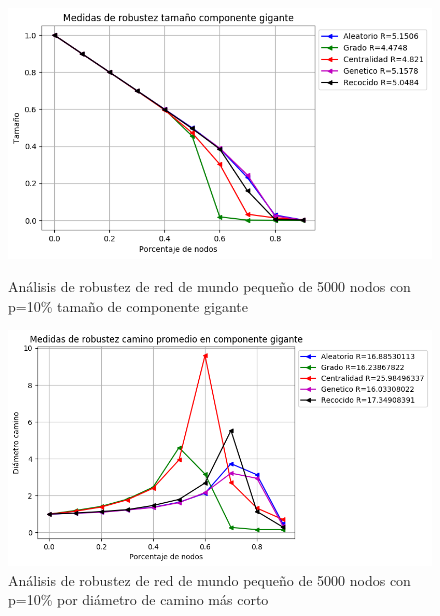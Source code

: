\begin{figure}[!htb]
    \begin{minipage}{0.48\textwidth}
        \centering
        \includegraphics[scale=0.4]{CapituloAAnexos/imagenesAnexoC/Robustez/grafica_GC20180510_143549SmallWorld5000NodesRewire01}
        \caption{Análisis de robustez de red de mundo pequeño de 5000 nodos con p=10\% tamaño de componente gigante}
    \end{minipage}\hfill
   \begin{minipage}{0.48\textwidth}
         \centering
       \includegraphics[scale=0.4]{CapituloAAnexos/imagenesAnexoC/Robustez/grafica_APL20180510_143549SmallWorld5000NodesRewire01}
        \caption{Análisis de robustez de red de mundo pequeño de 5000 nodos con p=10\% por diámetro de camino más corto}
    \end{minipage}
\end{figure}

